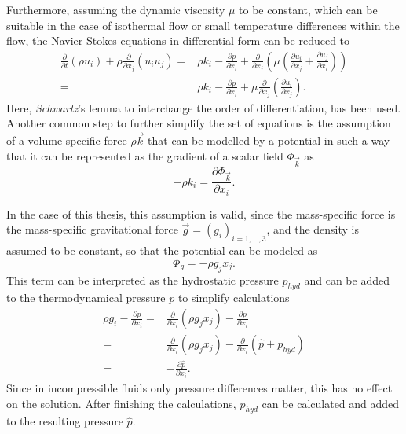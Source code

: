 Furthermore, assuming the dynamic viscosity \(\mu\) to be constant, which can be suitable in the case of isothermal flow or small temperature differences within the flow, the Navier-Stokes equations in differential form can be reduced to 
\begin{subequations}
\label{eq:navierstokes}
\begin{align}
  \frac{\partial}{\partial t}   \left(\rho u_i \right)
  + \rho \frac{\partial}{\partial x_j} \left( u_i  u_j \right) 
  =& \rho k_i
  - \frac{\partial p}{\partial x_i}
+ \frac{\partial}{\partial x_j} \left( \mu  \left( \frac{\partial u_i}{\partial x_j} 
+ \frac{\partial u_j}{\partial x_i} \right) \right) \\[0.5em]
  =& \rho k_i
  - \frac{\partial p}{\partial x_i}
  + \mu \frac{\partial}{\partial x_j} \left( \frac{\partial u_i}{\partial x_j} \right).
\end{align}
\end{subequations}
Here, \emph{Schwartz}'s lemma to interchange the order of differentiation, has been used. Another common step to further simplify the set of equations is the assumption of a volume-specific force \(\rho \vec{k}\) that can be modelled by a potential in such a way that it can be represented as the gradient of a scalar field \(\Phi_\vec{k}\) as
\begin{displaymath}
 - \rho k_i = \frac{\partial \Phi_\vec{k}}{\partial x_i}.
\end{displaymath}

In the case of this thesis, this assumption is valid, since the mass-specific force is the mass-specific gravitational force \(\vec{g} = \left( g_i \right)_{i = 1,\dots,3}\), and the density is assumed to be constant, so that the potential can be modeled as
\begin{displaymath}
  \Phi_g = - \rho g_j x_j.
\end{displaymath}
This term can be interpreted as the hydrostatic pressure \(p_{hyd}\) and can be added to the thermodynamical pressure \(p\) to simplify calculations 
\begin{align*}
  \rho g_i - \frac{\partial p}{\partial x_i} 
  =& \frac{\partial}{\partial x_i} \left( \rho g_j x_j \right) - \frac{\partial p}{\partial x_i} \nonumber \\[0.5em]
  =& \frac{\partial}{\partial x_i} \left( \rho g_j x_j \right) - \frac{\partial}{\partial x_i}  \left(\hat{p} + p_{hyd} \right) \nonumber \\[0.5em]
  =& - \frac{\partial \hat{p}}{\partial x_i}.
\end{align*}
Since in incompressible fluids only pressure differences matter, this has no effect on the solution. After finishing the calculations, \(p_{hyd}\) can be calculated and added to the resulting pressure \(\hat{p}\).


